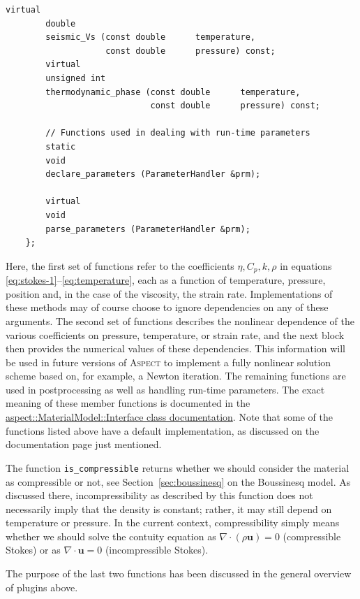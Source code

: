 \documentclass{article}
\newcommand{\aspect}{\textsc{Aspect}}
\begin{document}
\begin{lstlisting}[frame=single]
        virtual
        double
        seismic_Vs (const double      temperature,
                    const double      pressure) const;
        virtual
        unsigned int
        thermodynamic_phase (const double      temperature,
                             const double      pressure) const;

        // Functions used in dealing with run-time parameters
        static
        void
        declare_parameters (ParameterHandler &prm);

        virtual
        void
        parse_parameters (ParameterHandler &prm);
    };
\end{lstlisting}
Here, the first set of functions refer to the coefficients $\eta,C_p,k,\rho$ in
equations \eqref{eq:stokes-1}--\eqref{eq:temperature}, each as a function of
temperature, pressure, position and, in the case of the viscosity, the strain
rate. Implementations of these methods may of course choose to ignore
dependencies on any of these arguments. The second set of functions describes
the nonlinear dependence of the various coefficients on pressure, temperature,
or strain rate, and the next block then provides the numerical values of these
dependencies. This information will be used in future versions of \aspect{} to
implement a fully nonlinear solution scheme based on, for example, a Newton
iteration. The remaining functions are used in postprocessing as well as
handling run-time parameters. The exact meaning of these member functions is
documented in the
\href{doc/doxygen/classaspect_1_1MaterialModel_1_1Interface.html}{aspect::MaterialModel::Interface
class documentation}. Note that some of the functions listed above have a
default implementation, as discussed on the documentation page just
mentioned.

The function \texttt{is\_compressible} returns whether we should consider the
material as compressible or not, see Section~\ref{sec:boussinesq} on the
Boussinesq model. As discussed there, incompressibility as described by this function
does not necessarily imply that the density is constant; rather, it
may still depend on temperature or pressure. In the current
context, compressibility simply means whether we should solve the contuity
equation as $\nabla \cdot (\rho \mathbf u)=0$ (compressible Stokes)
or as $\nabla \cdot \mathbf{u}=0$ (incompressible Stokes).

The purpose of the last two functions has been discussed in the general
overview of plugins above.
\end{document}
